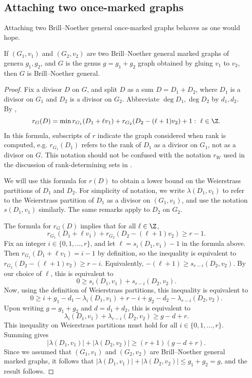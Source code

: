 \subsection{Attaching two once-marked graphs}

Attaching two Brill--Noether general once-marked graphs behaves as one would hope.

\begin{prop}\label{prop:glueMarked}
If $(G_1,v_1)$ and $(G_2,v_2)$ are two Brill--Noether general marked graphs of genera $g_1,g_2$, and $G$ is the genus $g = g_1+g_2$ graph obtained by gluing  $v_1$ to $v_2$, then $G$ is Brill--Noether general.
\end{prop}

\begin{proof}
Fix a divisor $D$ on $G$, and split $D$ as a sum $D = D_1 + D_2$, where $D_1$ is a divisor on $G_1$ and $D_2$ is a divisor on $G_2$. Abbreviate $\deg D_1, \deg D_2$ by $d_1,d_2$.  By \cite[Prop. 3.15]{Pfl22}, 
$$r_G(D) = \min{ r_{G_1}(D_1 + \ell v_1) + r_{G_2}(D_2 - (\ell+1) v_2) + 1:\ \ell \in \Z}.$$
In this formula, subscripts of $r$ indicate the graph considered when rank is computed, e.g. $r_{G_1}(D_1)$ refers to the rank of $D_1$ as a divisor on $G_1$, not as a divisor on $G$. This notation should not be confused with the notation $r_W$ used in the discussion of rank-determining sets in .

We will use this formula for $r(D)$ to obtain a lower bound on the Weierstrass partitions of $D_1$ and $D_2$. For simplicity of notation, we write $\lambda(D_1,v_1)$ to refer to the Weierstrass partition of $D_1$ as a divisor on $(G_1,v_1)$, and use the notation $s(D_1, v_1)$ similarly. The same remarks apply to $D_2$ on $G_2$. 

The formula for $r_G(D)$ implies that for all $\ell \in \Z$,
$$r_{G_1}(D_1 + \ell v_1) + r_{G_2}(D_2 - (\ell+1) v_2) \geq r-1.$$
Fix an integer $i \in \{0, 1, \ldots, r\}$, and let $\ell = s_i(D_1,v_1)-1$ in the formula above. Then $r_{G_1}(D_1 + \ell v_1) = i-1$ by definition, so the inequality is equivalent to
$r_{G_2}(D_2 - (\ell+1) v_2) \geq r - i$. Equivalently, $-(\ell+1) \geq s_{r-i}(D_2, v_2)$. By our choice of $\ell$, this is equivalent to 
$$0 \geq s_i(D_1,v_1) + s_{r-i}(D_2,v_2).$$
Now, using the definition of Weierstrass partitions, this inequality is equivalent to
$$ 0 \geq i + g_1 - d_1 - \lambda_i(D_1,v_1) + r-i + g_2 - d_2 - \lambda_{r-i}(D_2,v_2).$$
Upon writing $g = g_1 + g_2$ and $d = d_1 + d_2$, this is equivalent to
$$\lambda_i(D_1, v_1) + \lambda_{r-i}(D_2,v_2) \geq g-d+r.$$
This inequality on Weierstrass partitions must hold for all $i \in \{0, 1, \ldots, r\}$. Summing gives
$$ |\lambda(D_1,v_1)| + |\lambda(D_2,v_2)| \geq (r+1)(g-d+r).$$
Since we assumed that $(G_1,v_1)$ and $(G_2,v_2)$ are Brill--Noether general marked graphs, it follows that $|\lambda(D_1,v_1)| + |\lambda(D_2,v_2)| \leq g_1 + g_2 = g$, and the result follows.
\end{proof}

